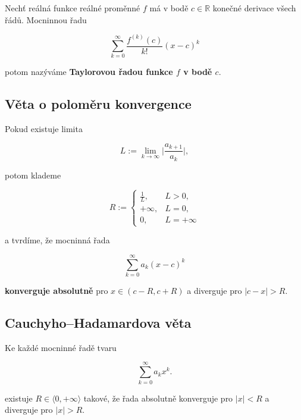 Nechť reálná funkce reálné proměnné $f$ má v bodě $c \in \mathbb{R}$ konečné
derivace všech řádů. Mocninnou řadu

\[ \sum_{k=0}^\infty \frac{f^{(k)}(c)}{k!} (x-c)^k \]

\noindent potom nazýváme \textbf{Taylorovou řadou funkce $f$ v bodě $c$}.

\subsection*{Věta o poloměru konvergence}

Pokud existuje limita

\[ L := \lim_{k\to\infty} \bigg|\frac{a_{k+1}}{a_k}\bigg|, \]

\noindent potom klademe

\[ R := \begin{cases} \frac{1}{L}, & L > 0, \\ +\infty, & L = 0, \\ 0, & L = +\infty \end{cases} \]

\noindent a tvrdíme, že mocninná řada

\[ \sum_{k = 0}^\infty a_k (x-c)^k  \]

\noindent \textbf{konverguje absolutně} pro $x\in(c-R,c+R)$ a diverguje pro $|c-x| > R$.

\subsection*{Cauchyho--Hadamardova věta}

Ke každé mocninné řadě tvaru

\[ \sum_{k=0}^\infty a_k x^k. \]

\noindent existuje $R\in\langle 0,+\infty\rangle$ takové, že řada absolutně konverguje
pro $|x| < R$ a diverguje pro $|x| > R$.

\pagebreak

